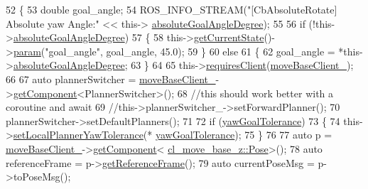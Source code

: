\begin{DoxyCode}
52 \{
53     \textcolor{keywordtype}{double} goal\_angle;
54     ROS\_INFO\_STREAM(\textcolor{stringliteral}{"[CbAbsoluteRotate] Absolute yaw Angle:"} << this->
      \hyperlink{classcl__move__base__z_1_1CbAbsoluteRotate_ad5d0e21549940444e1cb525cda73329a}{absoluteGoalAngleDegree});
55 
56     \textcolor{keywordflow}{if} (!this->\hyperlink{classcl__move__base__z_1_1CbAbsoluteRotate_ad5d0e21549940444e1cb525cda73329a}{absoluteGoalAngleDegree})
57     \{
58         this->\hyperlink{classsmacc_1_1SmaccClientBehavior_abf6773e4dd948f932f11a346dd6e7c2c}{getCurrentState}()->\hyperlink{classsmacc_1_1ISmaccState_a4982f2187ed6da337462721146e8ef70}{param}(\textcolor{stringliteral}{"goal\_angle"}, goal\_angle, 45.0);
59     \}
60     \textcolor{keywordflow}{else}
61     \{
62         goal\_angle = *this->\hyperlink{classcl__move__base__z_1_1CbAbsoluteRotate_ad5d0e21549940444e1cb525cda73329a}{absoluteGoalAngleDegree};
63     \}
64 
65     this->\hyperlink{classsmacc_1_1SmaccClientBehavior_a917f001e763a1059af337bf4e164f542}{requiresClient}(\hyperlink{classcl__move__base__z_1_1CbAbsoluteRotate_a8ddbef73316ff96f30493b28b5627e35}{moveBaseClient\_});
66 
67     \textcolor{keyword}{auto} plannerSwitcher = \hyperlink{classcl__move__base__z_1_1CbAbsoluteRotate_a8ddbef73316ff96f30493b28b5627e35}{moveBaseClient\_}->\hyperlink{classsmacc_1_1ISmaccClient_adef78db601749ca63c19e74a27cb88cc}{getComponent}<PlannerSwitcher>();
68     \textcolor{comment}{//this should work better with a coroutine and await}
69     \textcolor{comment}{//this->plannerSwitcher\_->setForwardPlanner();}
70     plannerSwitcher->setDefaultPlanners();
71 
72     \textcolor{keywordflow}{if} (\hyperlink{classcl__move__base__z_1_1CbAbsoluteRotate_a8d8b5b9c2c821efe101bb07c96c4bdd3}{yawGoalTolerance})
73     \{
74         this->\hyperlink{classcl__move__base__z_1_1CbAbsoluteRotate_aba8d93d615ccd43acd0684f8e88e2209}{setLocalPlannerYawTolerance}(*
      \hyperlink{classcl__move__base__z_1_1CbAbsoluteRotate_a8d8b5b9c2c821efe101bb07c96c4bdd3}{yawGoalTolerance});
75     \}
76 
77     \textcolor{keyword}{auto} p = \hyperlink{classcl__move__base__z_1_1CbAbsoluteRotate_a8ddbef73316ff96f30493b28b5627e35}{moveBaseClient\_}->\hyperlink{classsmacc_1_1ISmaccClient_adef78db601749ca63c19e74a27cb88cc}{getComponent}<
      \hyperlink{classcl__move__base__z_1_1Pose}{cl\_move\_base\_z::Pose}>();
78     \textcolor{keyword}{auto} referenceFrame = p->\hyperlink{classcl__move__base__z_1_1Pose_aaef18a35d7698fcbf6712149eead8e8d}{getReferenceFrame}();
79     \textcolor{keyword}{auto} currentPoseMsg = p->toPoseMsg();

\end{DoxyCode}
